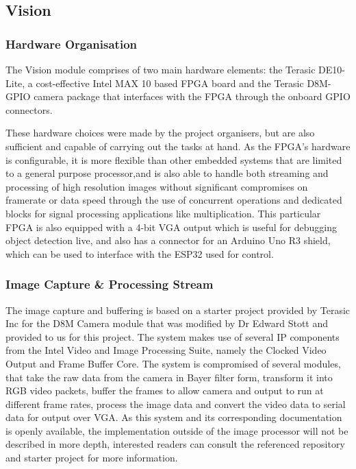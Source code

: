 \documentclass[a4paper]{article}
\begin{document}
\subsection{Vision}

\subsubsection{Hardware Organisation}

The Vision module comprises of two main hardware elements: 
    the Terasic DE10-Lite, a cost-effective Intel MAX 10 based FPGA board 
    \cite{TerasicDE10Web} 
    and the Terasic D8M-GPIO camera package \cite{TerasicD8MWeb}
that interfaces with the FPGA through the onboard GPIO connectors. 

These hardware choices were made by the project organisers, 
but are also sufficient and capable of carrying out the tasks at hand. 
As the FPGA's hardware is configurable, 
it is more flexible than other embedded systems 
that are limited to a general purpose processor,and 
is also able to handle both streaming and processing of high resolution images
without significant compromises on framerate or data speed 
through the use of concurrent operations and dedicated blocks 
for signal processing applications like multiplication.
This particular FPGA is also equipped with a 4-bit VGA output 
which is useful for debugging object detection live, 
and also has a connector for an Arduino Uno R3 shield, \cite{TerasicDE10Web} 
which can be used to interface with the ESP32 used for control.  

 

\subsubsection{Image Capture \& Processing Stream}

The image capture and buffering is based on a starter project provided
by Terasic Inc for the D8M Camera module that was modified by Dr Edward Stott 
\cite{EEE2Rover} and provided to us for this project. The system makes use of 
several IP components from the Intel Video and Image Processing Suite,
namely the Clocked Video Output and Frame Buffer Core. The system is compromised
of several modules, that take the raw data from the camera in Bayer filter form\cite{TerasicD8MWeb},
transform it into RGB video packets, buffer the frames to allow camera and output
to run at different frame rates, process the image data and convert the video 
data to serial data for output over VGA.\cite{EEE2Rover} As this system and its 
corresponding documentation is openly available, the implementation outside of 
the image processor will not be described in more depth, interested readers can 
consult the referenced repository and starter project for more information. 
\end{document}
